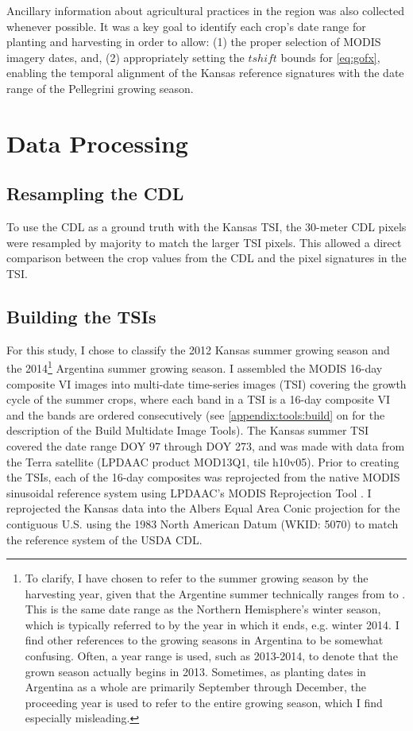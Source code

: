 Ancillary information about agricultural practices in the region was also collected whenever possible. It was a key goal to identify each crop's date range for planting and harvesting in order to allow: (1) the proper selection of MODIS imagery dates, and, (2) appropriately setting the $tshift$ bounds for \autoref{eq:gofx}, enabling the temporal alignment of the Kansas reference signatures with the date range of the Pellegrini growing season.

\section{Data Processing}

\subsection{Resampling the CDL}

To use the CDL as a ground truth with the Kansas TSI, the 30-meter CDL pixels were resampled by majority to match the larger TSI pixels. This allowed a direct comparison between the crop values from the CDL and the pixel signatures in the TSI.

\subsection{Building the TSIs}
\label{buildingTSIs}

For this study, I chose to classify the 2012 Kansas summer growing season and the 2014\footnote{To clarify, I have chosen to refer to the summer growing season by the harvesting year, given that the Argentine summer technically ranges from  to . This is the same date range as the Northern Hemisphere's winter season, which is typically referred to by the year in which it ends, e.g. winter 2014. I find other references to the growing seasons in Argentina to be somewhat confusing. Often, a year range is used, such as 2013-2014, to denote that the grown season actually begins in 2013. Sometimes, as planting dates in Argentina as a whole are primarily September through December, the proceeding year is used to refer to the entire growing season, which I find especially misleading.} Argentina summer growing season. I assembled the MODIS 16-day composite VI images into multi-date time-series images (TSI) covering the growth cycle of the summer crops, where each band in a TSI is a 16-day composite VI and the bands are ordered consecutively (see \autoref{appendix:tools:build} on  for the description of the Build Multidate Image Tools). The Kansas summer TSI covered the date range DOY 97 through DOY 273, and was made with data from the Terra satellite (LPDAAC product MOD13Q1, tile h10v05). Prior to creating the TSIs, each of the 16-day composites was reprojected from the native MODIS sinusoidal reference system using LPDAAC's MODIS Reprojection Tool \autocite{modis4.1}. I reprojected the Kansas data into the Albers Equal Area Conic projection for the contiguous U.S. using the 1983 North American Datum (WKID: 5070) to match the reference system of the USDA CDL.

